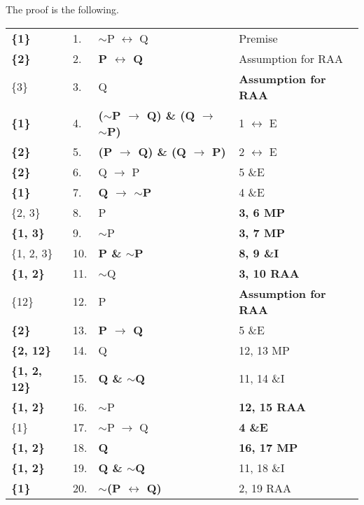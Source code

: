 \documentclass[a4paper,12pt]{article}
\newcommand{\mra}{$\rightarrow$ }
\newcommand{\mlra}{$\leftrightarrow$ }
\newcommand{\ms}{$\sim$}
\begin{document}
\begin{enumerate}[label=\arabic*,leftmargin=*]
\begin{enumerate}[label=\arabic*.]
        \end{enumerate}

        \begin{minipage}{\textwidth}
        \item The proof is the following.
            \vspace{1em}\\
            \begin{tabular}{l l l l}
                \textbf{\{1\}} & 1. & \ms P \mlra Q & Premise\\
                \textbf{\{2\}} & 2. & \textbf{P \mlra Q} & Assumption for RAA\\
                \{3\} & 3. & Q & \textbf{Assumption for RAA}\\
                \textbf{\{1\}} & 4. & \textbf{(\ms P \mra Q) \& (Q \mra \ms P)} & 1 \mlra E\\
                \textbf{\{2\}} & 5. & \textbf{(P \mra Q) \& (Q \mra P)} & 2 \mlra E\\
                \textbf{\{2\}} & 6. & Q \mra P & 5 \&E\\
                \textbf{\{1\}} & 7. & \textbf{Q \mra \ms P} & 4 \&E\\
                \{2, 3\} & 8. & P & \textbf{3, 6 MP} \\
                \textbf{\{1, 3\}} & 9. & \ms P & \textbf{3, 7 MP} \\
                \{1, 2, 3\} & 10. & \textbf{P \& \ms P} & \textbf{8, 9 \&I} \\
                \textbf{\{1, 2\}} & 11. & \ms Q & \textbf{3, 10 RAA}\\
                \{12\} & 12. & P & \textbf{Assumption for RAA} \\
                \textbf{\{2\}} & 13. & \textbf{P \mra Q} & 5 \&E\\
                \textbf{\{2, 12\}} & 14. & Q & 12, 13 MP\\
                \textbf{\{1, 2, 12\}} & 15. & \textbf{Q \& \ms Q} & 11, 14 \&I\\
                \textbf{\{1, 2\}} & 16. & \ms P & \textbf{12, 15 RAA}\\
                \{1\} & 17. & \ms P \mra Q & \textbf{4 \&E}\\
                \textbf{\{1, 2\}} & 18. & \textbf{Q} & \textbf{16, 17 MP} \\
                \textbf{\{1, 2\}} & 19. & \textbf{Q \& \ms Q} & 11, 18 \&I\\
                \textbf{\{1\}} & 20. & \textbf{\ms (P \mlra Q)} & 2, 19 RAA\\
            \end{tabular}
        \end{minipage}


\end{enumerate}
\end{document}
